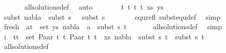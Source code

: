 \begin{isabellebody}
\ \ \ \ \ \isamarkupfalse%
\ all{\isacharunderscore}{\kern0pt}solutions{\isacharunderscore}{\kern0pt}def\ \isamarkupfalse%
\ auto\isanewline
\ \isamarkupfalse%
\isanewline
\ \ \ \isamarkupfalse%
\ {\isacharparenleft}{\kern0pt}{}\ t{}\ t{}\ t{}\ t{}\ xs\ ys{\isacharparenright}{\kern0pt}\isanewline
\ \ \ \isamarkupfalse%
\ \isamarkupfalse%
\ subst{\isacharcolon}{\kern0pt}\ {\isachardoublequoteopen}nabla{}\ {\isasymTurnstile}\ subst\ {\isacharparenleft}{\kern0pt}s{}{\isasymbullet}\ {\isacharbrackleft}{\kern0pt}{\isacharbrackright}{\kern0pt}{\isacharparenright}{\kern0pt}\ {\isasymapprox}\ subst\ s{}{\isachardoublequoteclose}\ \isanewline
\ \ \ \ \ \isamarkupfalse%
\ equ{\isacharunderscore}{\kern0pt}refl\ subst{\isacharunderscore}{\kern0pt}equ{\isacharunderscore}{\kern0pt}def\ \isamarkupfalse%
\ simp\isanewline
\isanewline
\ \ \ \isamarkupfalse%
\ {}\isanewline
\ \ \ \isamarkupfalse%
\ fresh{\isacharcolon}{\kern0pt}\ {\isachardoublequoteopen}{\isasymforall}\ {\isacharparenleft}{\kern0pt}a{\isacharcomma}{\kern0pt}t{\isacharparenright}{\kern0pt}\ {\isasymin}\ set\ ys{\isachardot}{\kern0pt}\ nabla{}\ {\isasymturnstile}\ a\ {\isasymsharp}\ subst\ s{}\ t{\isachardoublequoteclose}\isanewline
\ \ \ \ \ \isamarkupfalse%
\ all{\isacharunderscore}{\kern0pt}solutions{\isacharunderscore}{\kern0pt}def\ \isamarkupfalse%
\ simp\isanewline
\isanewline
\ \ \ \isamarkupfalse%
\ {}\isanewline
\ \ \ \isamarkupfalse%
\ i{\isacharcolon}{\kern0pt}\ {\isachardoublequoteopen}{\isasymforall}\ {\isacharparenleft}{\kern0pt}t{}{\isacharcomma}{\kern0pt}t{}{\isacharparenright}{\kern0pt}\ {\isasymin}\ set\ {\isacharparenleft}{\kern0pt}{\isacharparenleft}{\kern0pt}Paar\ t{}\ t{}{\isacharcomma}{\kern0pt}\ Paar\ t{}\ t{}{\isacharparenright}{\kern0pt}\ {\isacharhash}{\kern0pt}\ xs{\isacharparenright}{\kern0pt}{\isachardot}{\kern0pt}\ nabla{}\ {\isasymturnstile}\ subst\ s{}\ t{}\ {\isasymapprox}\ subst\ s{}\ t{}{\isachardoublequoteclose}\isanewline
\ \ \ \ \ \isamarkupfalse%
\ all{\isacharunderscore}{\kern0pt}solutions{\isacharunderscore}{\kern0pt}def\ \isamarkupfalse%

\end{isabellebody}
